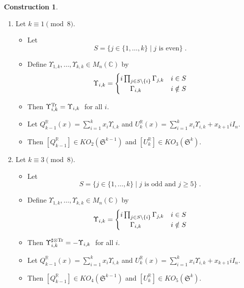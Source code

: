 \documentclass[12pt, reqno]{amsart}
\theoremstyle{definition}
\newtheorem{const}[thm]{Construction}
\def\R{{\mathbb R}}
\def\C{{\mathbb C}}
\def\T{{\mathbb T}}
\def\Up{{\Upsilon}}
\def\pr{^{\scriptscriptstyle \R}}
\def\T{ ^{\rm{Tr}}}
\def\sT{ ^{\sharp \otimes {\rm{Tr}}}}
\newcommand{\fS}{\mathfrak S}
\begin{document}
\begin{const}
\begin{enumerate}
\item[(2)] Let $k \equiv 1 \pmod 8$.
\begin{itemize}
\item Let $$  S=  \{j \in  \{1, \dots, k\} \mid \text{$j$ is even} \} \; .$$
\item Define $\Up_{1,k}, \dots, \Up_{k,k} \in M_n(\C)$ by
$$\Up_{i,k} =
	\begin{cases} 
			 i  \prod_{ j \in S \backslash \{i\}} \Gamma_{j,k} & i \in S \\ \hspace{.5cm} \Gamma_{i,k} & i \notin S 
	\end{cases} $$
\item Then $\Up\T_{i,k} =   \Up_{i,k} \; $ for all $i$.
\item Let $Q\pr_{k-1}(x) = \sum_{i = 1}^k x_i \Up_{i,k}$ and $U\pr_k(x) = \sum_{i = 1}^k x_i \Up_{i,k} + x_{k+1} i I_n$.
\item Then $[Q\pr_{k-1}] \in KO_{2}(\fS^{k-1})$ and $[U\pr_k] \in KO_{3}(\fS^{k})$.
\end{itemize}

\vspace{.5cm}

\item[(3)] Let $k \equiv 3 \pmod 8$.
\begin{itemize}
\item Let $$  S=  \{j \in  \{1, \dots, k\} \mid \text{$j$ is odd and $j \geq 5$} \} \; .$$
\item Define $\Up_{1,k}, \dots, \Up_{k,k} \in M_n(\C)$ by
$$\Up_{i,k} =
	\begin{cases} 
			 i  \prod_{ j \in S \backslash \{i\}} \Gamma_{j,k} & i \in S \\ \hspace{.5cm} \Gamma_{i,k} & i \notin S 
	\end{cases} $$
\item Then $\Up\sT_{i,k} =  - \Up_{i,k} \; $ for all $i$.
\item Let $Q\pr_{k-1}(x) = \sum_{i = 1}^k x_i \Up_{i,k}$ and $U\pr_k(x) = \sum_{i = 1}^k x_i \Up_{i,k} + x_{k+1} i I_n$.
\item Then $[Q\pr_{k-1}] \in KO_{4}(\fS^{k-1})$ and $[U\pr_k] \in KO_{5}(\fS^{k})$.
\end{itemize}

\vspace{.5cm}


\end{enumerate}
\end{const}
\end{document}

